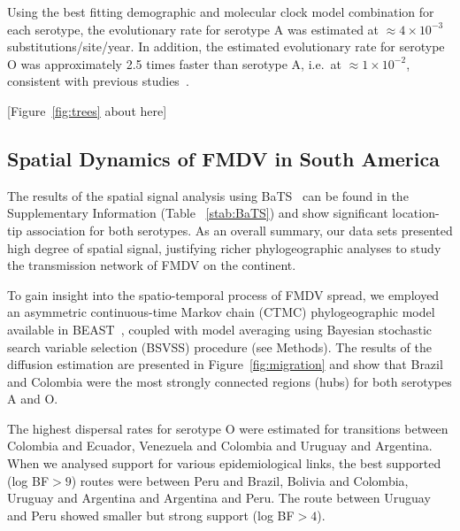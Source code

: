 \documentclass[10pt]{article}
\begin{document}
Using the best fitting demographic and molecular clock model combination for each serotype, the evolutionary rate for serotype A was estimated at  $\approx 4 \times 10^{-3}$ substitutions/site/year.
In addition, the estimated evolutionary rate for serotype O was approximately 2.5 times faster than serotype A, i.e.~at $\approx 1 \times 10^{-2}$, consistent with previous studies~\cite{tully, Carvalho2013, Muellner2011}. 

\begin{center}
 [Figure~\ref{fig:trees} about here]
\end{center}

\subsection*{Spatial Dynamics of FMDV in South America}

The results of the spatial signal analysis using BaTS~\cite{bats} can be found in the Supplementary Information (Table ~\ref{stab:BaTS}) and show significant location-tip association for both serotypes.
As an overall summary, our data sets presented high degree of spatial signal, justifying richer phylogeographic analyses to study the transmission network of FMDV on the continent.

To gain insight into the spatio-temporal process of FMDV spread, we employed an asymmetric continuous-time Markov chain (CTMC) phylogeographic model~\cite{roots} available in BEAST~\cite{beast2012}, coupled with model averaging using Bayesian stochastic search variable selection (BSVSS) procedure (see Methods).
The results of the diffusion estimation are presented in Figure~\ref{fig:migration} and show that Brazil and Colombia were the most strongly connected regions (hubs) for both serotypes A and O.

The highest dispersal rates for serotype O were estimated for transitions between Colombia and Ecuador, Venezuela and Colombia and Uruguay and Argentina.
When we analysed support for various epidemiological links, the best supported (log BF$>9$) routes were between Peru and Brazil, Bolivia and Colombia, Uruguay and Argentina and Argentina and Peru.
The route between Uruguay and Peru showed smaller but strong support (log BF$>4$).
\end{document}
